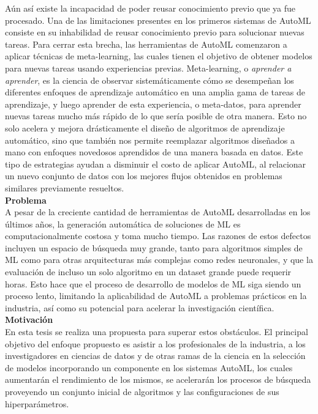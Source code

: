 Aún así existe la incapacidad de poder reusar conocimiento previo que ya fue
procesado. Una de las limitaciones presentes en los primeros sistemas de AutoML
consiste en su inhabilidad de reusar conocimiento previo para solucionar nuevas
tareas. Para cerrar esta brecha, las herramientas de AutoML comenzaron a
aplicar técnicas de meta-learning, las cuales tienen el objetivo de obtener
modelos para nuevas tareas usando experiencias previas. Meta-learning, o
\emph{aprender a aprender}, es la ciencia de observar sistemáticamente cómo se
desempeñan los diferentes enfoques de aprendizaje automático en una amplia
gama de tareas de aprendizaje, y luego aprender de esta experiencia, o
meta-datos, para aprender nuevas tareas mucho más rápido de lo que sería
posible de otra manera. Esto no solo acelera y mejora drásticamente el diseño
de algoritmos de aprendizaje automático, sino que también nos permite
reemplazar algoritmos diseñados a mano con enfoques novedosos aprendidos de una
manera basada en datos. Este tipo de estrategias ayudan a disminuir el costo de
aplicar AutoML, al relacionar un nuevo conjunto de datos con los mejores flujos
obtenidos en problemas similares previamente resueltos.\\

\textbf{\Large Problema}\\

A pesar de la creciente cantidad de herramientas de AutoML desarrolladas en los
últimos años, la generación automática de soluciones de ML es
computacionalmente costosa y toma mucho tiempo. Las razones de estos defectos
incluyen un espacio de búsqueda muy grande, tanto para algoritmos simples de ML
como para otras arquitecturas más complejas como redes neuronales, y que la
evaluación de incluso un solo algoritmo en un dataset grande puede requerir
horas. Esto hace que el proceso de desarrollo de modelos de ML siga siendo un
proceso lento, limitando la aplicabilidad de AutoML a problemas prácticos en la
industria, así como su potencial para acelerar la investigación científica.\\

\textbf{\Large Motivación}\\

En esta tesis se realiza una propuesta para superar estos obstáculos. El
principal objetivo del enfoque propuesto es asistir a los profesionales de la
industria, a los investigadores en ciencias de datos y de otras ramas de la
ciencia en la selección de modelos incorporando un componente en los
sistemas AutoML, los cuales aumentarán el rendimiento de los mismos, se
acelerarán los procesos de búsqueda proveyendo un conjunto inicial de
algoritmos y las configuraciones de sus hiperparámetros.


